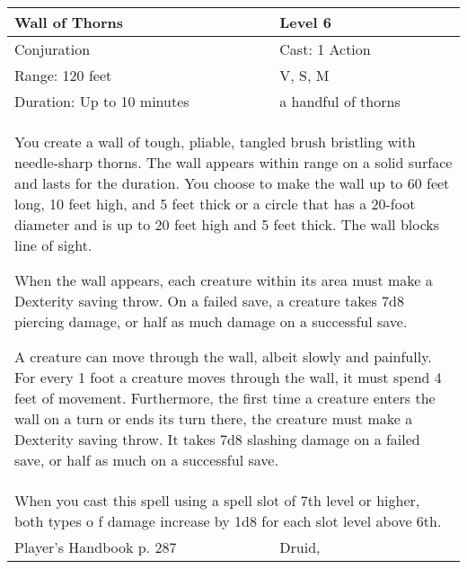 \documentclass[11pt]{report}
\begin{document}
\begin{table}[H]
	\begin{tabular}{||p{6cm}|p{6cm}||}
		\hline\hline
		\bf{Wall of Thorns} & Level 6\\ \hline
		Conjuration & Cast: 1 Action\\ \hline
		Range: 120 feet & V, S, M\\ \hline
		Duration: Up to 10 minutes & a handful of thorns\\ \hline
		\multicolumn{2}{||p{12cm}||}{You create a wall of tough, pliable, tangled brush bristling with needle-sharp thorns. The wall appears within range on a solid surface and lasts for the duration. You choose to make the wall up to 60 feet long, 10 feet high, and 5 feet thick or a circle that has a 20-foot diameter and is up to 20 feet high and 5  feet thick. The wall blocks line of sight.

When the wall appears, each creature within its area must make a Dexterity saving throw. On a failed save, a creature takes 7d8 piercing damage, or half as much damage on a successful save.

A creature can move through the wall, albeit slowly and painfully. For every 1 foot a creature moves through the wall, it must spend 4 feet of movement. Furthermore, the first time a creature enters the wall on a turn or ends its turn there, the creature must make a Dexterity saving throw. It takes 7d8 slashing damage on a failed save, or half as much on a successful save.}\\ \hline
		\multicolumn{2}{||p{12cm}||}{When you cast this spell using a spell slot of 7th level or higher, both types o f damage increase by 1d8 for each slot level above 6th.}\\ \hline
Player's Handbook p. 287 & Druid, \\ \hline\hline
	\end{tabular}
\end{table}
\end{document}
